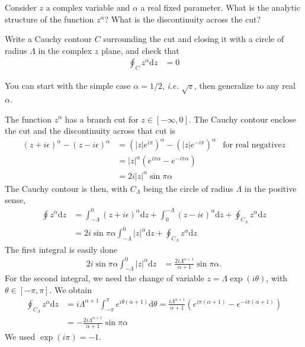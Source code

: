 
Consider $z$ a complex variable and $\alpha$ a real fixed parameter. What is the analytic structure of the function $z^\alpha$? What is the discontinuity across the cut?

Write a Cauchy contour $C$ surrounding the cut and closing it with a circle of radius $\Lambda$ in the complex $z$ plane, and check that
\begin{align}
    \oint_{C} z^\alpha \mathrm d z & = 0
\end{align}

You can start with the simple case $\alpha = 1/2$, {\it i.e.} $\sqrt{z}$, then generalize to any real $\alpha$.

\begin{solution}
    The function $z^\alpha$ has a branch cut for $z\in [-\infty, 0]$. The Cauchy contour enclose the cut and the discontinuity across that cut is
    \begin{align}
        (z+i\epsilon)^\alpha - (z-i\epsilon)^\alpha & =  (|z| e^{i \pi})^\alpha- (|z| e^{-i \pi})^\alpha              & \text{for real negative} z
        \\
                                                    & = |z|^\alpha \left( e^{i\pi \alpha} - e^{-i\pi \alpha}  \right)
        \\
                                                    & = 2 i |z|^\alpha \sin \pi \alpha
    \end{align}
    The Cauchy contour is then, with $C_\Lambda$ being the circle of radius $\Lambda$ in the positive sense,
    \begin{align}
        \oint z^\alpha \mathrm d z & = \int_{-\Lambda}^0 (z+i \epsilon)^\alpha \mathrm d z + \int^{-\Lambda}_0 (z-i \epsilon)^\alpha \mathrm d z + \oint_{C_\Lambda} z^\alpha \mathrm d z
        \\
                                   & = 2i \sin \pi \alpha \int_{-\Lambda}^0 |z|^\alpha \mathrm d z + \oint_{C_\Lambda} z^\alpha \mathrm d z
    \end{align}
    The first integral is easily done
    \begin{align}
        2i \sin \pi \alpha \int_{-\Lambda}^0 |z|^\alpha \mathrm d z & = \frac{2i \Lambda^{\alpha+1}}{\alpha+1} \sin \pi \alpha.
    \end{align}
    For the second integral, we need the change of variable $z = \Lambda \exp(i \theta)$, with $\theta \in [-\pi,\pi]$. We obtain
    \begin{align}
        \oint_{C_\Lambda} z^\alpha \mathrm d z & =
        i\Lambda^{\alpha+1} \int_{-\pi}^\pi e^{i \theta(\alpha+1)} \mathrm d \theta =  \frac{i\Lambda^{\alpha+1}}{\alpha+1}
        \left(e^{i \pi(\alpha+1)} -e^{-i \pi(\alpha+1)} \right)
        \\
                                               & = - \frac{2i \Lambda^{\alpha+1}}{\alpha+1} \sin \pi \alpha
    \end{align}
    We used $\exp(i\pi) = -1$.
\end{solution}